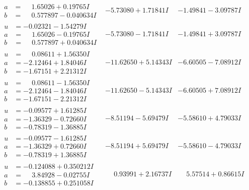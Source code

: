 \documentclass[1p]{elsarticle_modified}
\theoremstyle{definition}
\begin{document}
$$\begin{array}{c|c|c}
\begin{aligned}
a &= \phantom{-}1.65026 + 0.19765 I \\
b &= \phantom{-}0.577897 - 0.040634 I\end{aligned}
 & -5.73080 + 1.71841 I & -1.49841 - 3.09787 I \\ \hline\begin{aligned}
u &= -0.02321 - 1.54279 I \\
a &= \phantom{-}1.65026 - 0.19765 I \\
b &= \phantom{-}0.577897 + 0.040634 I\end{aligned}
 & -5.73080 - 1.71841 I & -1.49841 + 3.09787 I \\ \hline\begin{aligned}
u &= \phantom{-}0.08611 + 1.56350 I \\
a &= -2.12464 + 1.84046 I \\
b &= -1.67151 + 2.21312 I\end{aligned}
 & -11.62650 + 5.14343 I & -6.60505 - 7.08912 I \\ \hline\begin{aligned}
u &= \phantom{-}0.08611 - 1.56350 I \\
a &= -2.12464 - 1.84046 I \\
b &= -1.67151 - 2.21312 I\end{aligned}
 & -11.62650 - 5.14343 I & -6.60505 + 7.08912 I \\ \hline\begin{aligned}
u &= -0.09577 + 1.61285 I \\
a &= -1.36329 - 0.72660 I \\
b &= -0.78319 - 1.36885 I\end{aligned}
 & -8.51194 - 5.69479 I & -5.58610 + 4.79033 I \\ \hline\begin{aligned}
u &= -0.09577 - 1.61285 I \\
a &= -1.36329 + 0.72660 I \\
b &= -0.78319 + 1.36885 I\end{aligned}
 & -8.51194 + 5.69479 I & -5.58610 - 4.79033 I \\ \hline\begin{aligned}
u &= -0.124088 + 0.350212 I \\
a &= \phantom{-}3.84928 - 0.02755 I \\
b &= -0.138855 + 0.251058 I\end{aligned}
 & \phantom{-}0.93991 + 2.16737 I & \phantom{-}5.57514 + 0.86615 I \\ \hline\begin{aligned}

\end{aligned}
\end{array}$$
\end{document}
